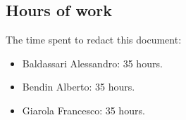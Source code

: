 \documentclass[a4paper,11pt]{report} %
\begin{document}
	\subsection{Hours of work} The time spent to redact this document:
	\begin{itemize}
		\item Baldassari Alessandro: 35 hours.
		\item Bendin Alberto: 35 hours.
		\item Giarola Francesco: 35 hours.
	\end{itemize}
\end{document}
